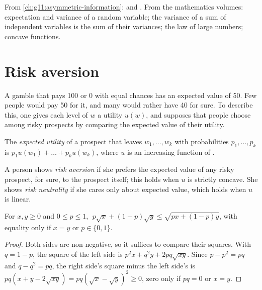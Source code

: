 \begin{recall}
From \cref{ch:g11:asymmetric-information}:  and . From the mathematics volumes: expectation and variance of a random variable; the variance
of a sum of independent variables is the sum of their variances; the law of large numbers; concave functions.
\end{recall}

\section{Risk aversion}\label{sec:g12:risk-and-insurance:aversion}

A gamble that pays 100 or 0 with equal chances has an expected value of 50. Few people would pay 50 for it, and many would rather have 40 for sure. To describe this, one
gives each level of  $w$ a utility $u(w)$, and supposes that people choose among risky prospects by comparing the expected value of their utility.

\begin{definition}\label{def:g12:risk-and-insurance:expected-utility}
The \emph{expected utility} of a prospect that leaves  $w_1, \dots, w_k$ with probabilities $p_1, \dots, p_k$ is $p_1 u(w_1) + \dots +
p_k u(w_k)$, where $u$ is an increasing function of .
\end{definition}

\begin{definition}\label{def:g12:risk-and-insurance:risk-aversion}
A person shows \emph{risk aversion} if she prefers the expected value of any risky prospect, for sure, to the prospect itself; this holds when $u$ is
strictly concave. She shows \emph{risk neutrality}\label{def:g12:risk-and-insurance:risk-neutrality} if she cares only about expected value,
which holds when $u$ is linear.
\end{definition}

\begin{proposition}\label{prop:g12:risk-and-insurance:jensen}
For $x, y \ge 0$ and $0 \le p \le 1$, $\;p\sqrt{x} + (1 - p)\sqrt{y} \le \sqrt{px + (1 - p)y}$, with equality only if $x = y$ or $p \in \{0, 1\}$.
\end{proposition}
\begin{proof}
Both sides are non-negative, so it suffices to compare their squares. With $q = 1 - p$, the square of the left side is $p^2x + q^2y + 2pq\sqrt{xy}$. Since $p - p^2 = pq$
and $q - q^2 = pq$, the right side's square minus the left side's is $pq(x + y - 2\sqrt{xy}) = pq(\sqrt{x} - \sqrt{y})^2 \ge 0$, zero only if $pq = 0$ or $x = y$.
\end{proof}


